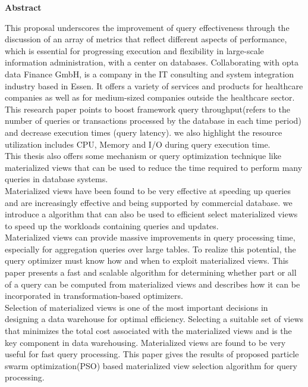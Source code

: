 \begin{center}
    \Large\textbf{Abstract}
\end{center}

\normalsize
This proposal underscores the improvement of query  effectiveness through  the  discussion of an array of metrics  that reflect different aspects of performance, which is  essential for progressing execution and flexibility in large-scale information administration, with a center on databases. Collaborating with opta data Finance GmbH, is a company in the IT consulting and system integration industry based in Essen. It offers a variety of services and products for healthcare companies as well as for medium-sized companies outside the healthcare sector. This research paper  points to boost framework query throughput(refers to the number of queries or transactions processed by the database in each time period) and decrease execution times (query latency). we also highlight the resource utilization includes CPU, Memory and I/O during query execution time.\\
This  thesis also offers some  mechanism or query optimization technique like materialized views that can be used to reduce the time required to perform many queries in database systems.\\
Materialized views have been found to be very effective at speeding up queries and are increasingly effective and being supported by commercial database. we introduce a algorithm that can also be used to efficient select materialized views to speed up the  workloads containing queries and updates.\\
Materialized views can provide massive improvements in query processing time, especially for aggregation queries over large tables. To realize this potential, the query optimizer must know how and when to exploit materialized views. This paper presents a fast and scalable algorithm for determining whether part or all of a query can be computed from materialized views and describes how it can be incorporated in transformation-based optimizers.\\

Selection of materialized views is one of the most important decisions in designing a data warehouse for optimal efficiency. Selecting a suitable set of views that minimizes the total cost associated with the materialized views and is the key component in data warehousing. Materialized views are found to be very useful for fast query
processing. This paper gives the results of proposed particle swarm optimization(PSO) based materialized view selection algorithm for
query processing.\\



